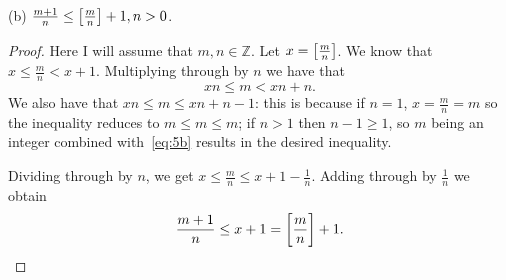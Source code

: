\documentclass{article}
\newcommand{\Z}{\mathbb{Z}}
\begin{document}
\vspace{5mm}

(b) $\frac{m + 1}{n} \leq \sbr{\frac{m}{n}} + 1, n > 0$.

\begin{proof}

Here I will assume that $m, n \in \Z$. Let $x = \sbr{\frac{m}{n}}$. We
know that $x \leq \frac{m}{n} < x + 1$. Multiplying through by $n$ we
have that
%
\begin{equation}
    x n \leq m < x n + n
    .
    \label{eq:5b}
\end{equation}
%
We also have that $x n \leq m \leq x n + n - 1$: this is because if $n =
1$, $x = \frac{m}{n} = m$ so the inequality reduces to $m \leq m \leq
m$; if $n > 1$ then $n - 1 \geq 1$, so $m$ being an integer combined
with~\eqref{eq:5b} results in the desired inequality.

Dividing through by $n$, we get
$x \leq \frac{m}{n} \leq x + 1 - \frac{1}{n}$. Adding through by
$\frac{1}{n}$ we obtain
%
\begin{equation*}
    \frac{m + 1}{n} \leq x + 1 = \sbr{\frac{m}{n}} + 1
    .
\end{equation*}

\end{proof}
\end{document}
